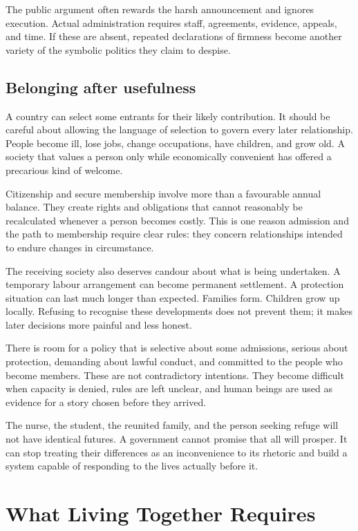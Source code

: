 \documentclass[12pt,a4paper]{book}
\begin{document}
The public argument often rewards the harsh announcement and ignores execution. Actual administration requires staff, agreements, evidence, appeals, and time. If these are absent, repeated declarations of firmness become another variety of the symbolic politics they claim to despise.

\section*{Belonging after usefulness}

A country can select some entrants for their likely contribution. It should be careful about allowing the language of selection to govern every later relationship. People become ill, lose jobs, change occupations, have children, and grow old. A society that values a person only while economically convenient has offered a precarious kind of welcome.

Citizenship and secure membership involve more than a favourable annual balance. They create rights and obligations that cannot reasonably be recalculated whenever a person becomes costly. This is one reason admission and the path to membership require clear rules: they concern relationships intended to endure changes in circumstance.

The receiving society also deserves candour about what is being undertaken. A temporary labour arrangement can become permanent settlement. A protection situation can last much longer than expected. Families form. Children grow up locally. Refusing to recognise these developments does not prevent them; it makes later decisions more painful and less honest.

There is room for a policy that is selective about some admissions, serious about protection, demanding about lawful conduct, and committed to the people who become members. These are not contradictory intentions. They become difficult when capacity is denied, rules are left unclear, and human beings are used as evidence for a story chosen before they arrived.

The nurse, the student, the reunited family, and the person seeking refuge will not have identical futures. A government cannot promise that all will prosper. It can stop treating their differences as an inconvenience to its rhetoric and build a system capable of responding to the lives actually before it.

\chapter{What Living Together Requires}
\end{document}
